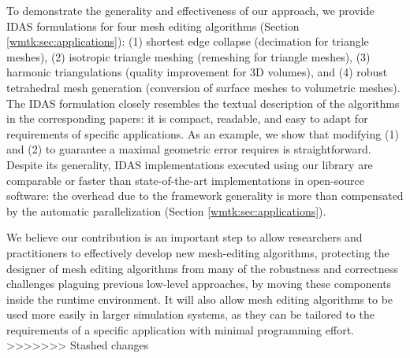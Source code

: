 To demonstrate the generality and effectiveness of our approach, we provide IDAS formulations for four mesh editing algorithms (Section \ref{wmtk:sec:applications}): (1) shortest edge collapse (decimation for triangle meshes), (2) isotropic triangle meshing (remeshing for triangle meshes), (3) harmonic triangulations (quality improvement for 3D volumes), and (4) robust tetrahedral mesh generation (conversion of surface meshes to volumetric meshes). 
The IDAS formulation closely resembles the textual description of the algorithms in the corresponding papers: it is compact, readable, and easy to adapt for requirements of specific applications. As an example, we show that modifying (1) and (2) to guarantee a maximal geometric error requires is straightforward. Despite its generality, IDAS implementations executed using our library are comparable or faster than state-of-the-art implementations in open-source software: the overhead due to the framework generality is more than compensated by the automatic parallelization (Section \ref{wmtk:sec:applications}).

We believe our contribution is an important step to allow researchers and practitioners to effectively develop new mesh-editing algorithms, protecting the designer of mesh editing algorithms from many of the robustness and correctness challenges plaguing previous low-level approaches, by moving these components inside the runtime environment. It will also allow mesh editing algorithms to be used more easily in larger simulation systems, as they can be tailored to the requirements of a specific application with minimal programming effort.
>>>>>>> Stashed changes

